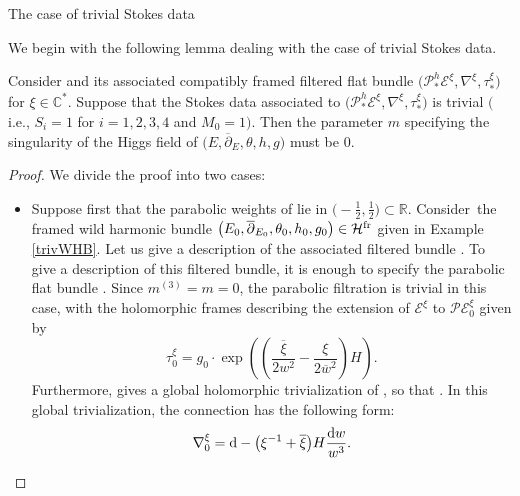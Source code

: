 \begin{subsubsection}{The case of trivial Stokes data}

We begin with the following lemma dealing with the case of trivial Stokes data.

\begin{Lemma}\label{m=0} Consider  and its associated compatibly framed filtered flat bundle $\bigl(\mathcal{P}^{h}_*\mathcal{E}^{\xi},\nabla^{\xi},\tau_*^{\xi}\bigr)$ for $\xi \in \mathbb{C}^*$. Suppose that the Stokes data associated to $\bigl(\mathcal{P}^{h}_*\mathcal{E}^{\xi},\nabla^{\xi},\tau_*^{\xi}\bigr)$ is trivial $($i.e., $S_i=1$ for $i=1,2,3,4$ and $M_0=1)$. Then the parameter $m$ specifying the singularity of the Higgs field of $\bigl(E,\overline{\partial}_E,\theta,h,g\bigr)$ must be $0$.
\end{Lemma}

\begin{proof}We divide the proof into two cases:
\begin{itemize}\itemsep=0pt
 \item Suppose first that the parabolic weights of  lie in $\bigl(-\frac12,\frac12\bigr)\subset \mathbb{R}$. Con\-sider~the framed wild harmonic bundle $\bigl(E_0,\overline{\partial}_{E_0},\theta_0,h_0,g_0\bigr) \in \mathcal{H}^{{\rm fr}}$ given in Example \ref{trivWHB}. Let us give a description of the associated filtered bundle . To give a description of this filtered bundle, it is enough to specify the parabolic flat bundle . Since $m^{(3)}=m=0$, the parabolic filtration is trivial in this case, with the holomorphic frames describing the extension of $\mathcal{E}^{\xi}$ to $\mathcal{PE}_0^{\xi}$ given by
 \[
 \tau_0^{\xi}=g_0\cdot \exp \left(\left(\frac{\overline{\xi}}{2w^2}-\frac{\xi}{2\overline{w}^{2}}\right)H\right).
 \]
 Furthermore,  gives a global holomorphic trivialization of , so that . In this global trivialization, the connection has the following form:
\begin{equation*}
 \nabla^{\xi}_0={\rm d}-\bigl(\xi^{-1}+\overline{\xi}\bigr)H\frac{{\rm d}w}{w^3}.
\end{equation*}


\end{itemize}
\end{proof}
\end{subsubsection}
